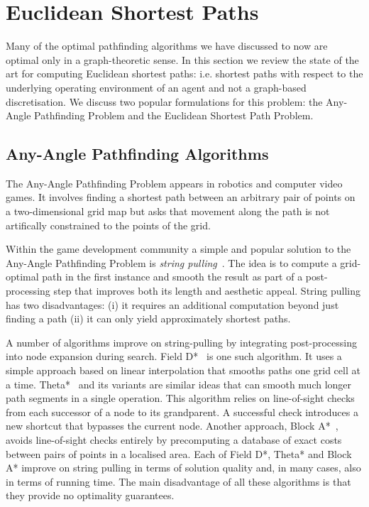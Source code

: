 \section{Euclidean Shortest Paths}
\label{cha::lit::euclidean}
Many of the optimal pathfinding algorithms we have discussed to now are optimal only in 
a graph-theoretic sense. In this section we review the state of the art for computing
Euclidean shortest paths: i.e. shortest paths with respect to the underlying operating 
environment of an agent and not a graph-based discretisation. We discuss two popular
formulations for this problem: the Any-Angle Pathfinding Problem and the Euclidean Shortest
Path Problem. 

\subsection{Any-Angle Pathfinding Algorithms}
\label{cha::lit::euclidean:anyangle}
The Any-Angle Pathfinding Problem appears in robotics and computer video games. It involves finding
a shortest path between an arbitrary pair of points on a two-dimensional grid map but asks that
movement along the path is not artifically constrained to the points of the grid.

Within the game development community a simple and popular solution to the Any-Angle Pathfinding
Problem is \emph{string pulling}~\cite{pinter01,botea04}.  The idea is to compute a grid-optimal
path in the first instance and smooth the result as part of a post-processing step that improves
both its length and aesthetic appeal. String pulling has two disadvantages: (i) it requires an
additional computation beyond just finding a path (ii) it can only yield approximately shortest
paths.

A number of algorithms improve on string-pulling by integrating post-processing into node expansion
during search. Field D*~\citep{ferguson05} is one such algorithm. It uses a simple approach based on
linear interpolation that smooths paths one grid cell at a time.  Theta*~\citep{nash07} and its
variants \citep{nash09,nash10,munoz12} are similar ideas that can smooth much longer path segments in a
single operation. This algorithm relies on line-of-sight checks from each successor of a node to its
grandparent. A successful check introduces a new shortcut that bypasses the current node.  Another
approach, Block A*~\cite{yap11}, avoids line-of-sight checks entirely by precomputing a database of
exact costs between pairs of points in a localised area.  Each of Field D*, Theta* and Block A*
improve on string pulling in terms of solution quality and, in many cases, also in terms of running
time.  The main disadvantage of all these algorithms is that they provide no optimality guarantees.

